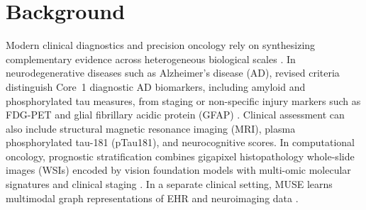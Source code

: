 \documentclass[10pt,twocolumn]{article}
\begin{document}
\begin{abstract}
\subsubsection*{Conclusions}
\texttt{DeepFuzzyTorch} delivers an installable, unit-tested PyTorch operator toolkit for
granular multi-omics reduction, missing-modality-invariant fusion, conflict-guided clinical
triage, and machine-precision white-box rule export.

\vspace{0.35em}
\noindent\textbf{Keywords:} Open-Source PyTorch Software; Multi-Omics Data Integration;
Fuzzy-Rough Feature Selection; Custom-Background Pathway Enrichment; Missing Modalities;
Biomarker Discordance; Computational Pathology.
\end{abstract}

\section{Background}
\label{sec:intro}

Modern clinical diagnostics and precision oncology rely on synthesizing complementary evidence
across heterogeneous biological scales \cite{baltrusaitis2018multimodal,acosta2022multimodal}.
In neurodegenerative diseases such as Alzheimer's disease (AD), revised criteria distinguish
Core~1 diagnostic AD biomarkers, including amyloid and phosphorylated tau measures, from
staging or non-specific injury markers such as FDG-PET and glial fibrillary acidic protein
(GFAP) \cite{jack2024revised,palmqvist2020discriminative,janelidze2020plasma}. Clinical
assessment can also include structural magnetic resonance imaging (MRI), plasma phosphorylated
tau-181 (pTau181), and neurocognitive scores. In computational oncology, prognostic
stratification combines gigapixel histopathology whole-slide images (WSIs) encoded by vision
foundation models \cite{chen2024uni,lu2024visual,filiot2023scaling,filiot2024phikonv2,%
kaiko2024towards,wang2022transformer,huang2023visual} with multi-omic molecular signatures and
clinical staging \cite{kather2019predicting,jaume2024survpath}. In a separate clinical setting,
MUSE learns multimodal graph representations of EHR and neuroimaging data \cite{wu2024muse}.
\end{document}
